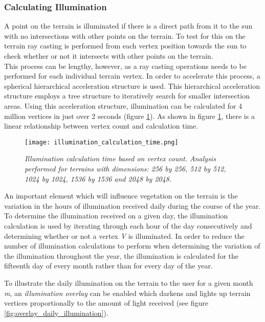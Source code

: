 \subsubsection{Calculating Illumination}

A point on the terrain is illuminated if there is a direct path from it to the sun with no intersections with other points on the terrain. To test for this on the terrain ray casting is performed from each vertex position towards the sun to check whether or not it intersects with other points on the terrain.\\
This process can be lengthy, however, as a ray casting operations needs to be performed for each individual terrain vertex. In order to accelerate this process, a spherical hierarchical acceleration structure is used. This hierarchical acceleration structure employs a tree structure to iteratively search for smaller intersection areas. Using this acceleration structure, illumination can be calculated for 4 million vertices in just over 2 seconds (figure \ref{fig:illumination_calculation_time}). As shown in figure \ref{fig:illumination_calculation_time}, there is a linear relationship between vertex count and calculation time. \\

\begin{figure}
\center
	\texttt{[image: illumination\_calculation\_time.png]}
	\caption{ \textit{Illumination calculation time based on vertex count. Analysis performed for terrains with dimensions: 256 by 256, 512 by 512, 1024 by 1024, 1536 by 1536 and 2048 by 2048.} }
	\label{fig:illumination_calculation_time}
\end{figure}

An important element which will influence vegetation on the terrain is the variation in the hours of illumination received daily during the course of the year. To determine the illumination received on a given day, the illumination calculation is used by iterating through each hour of the day consecutively and determining whether or not a vertex \textit{V} is illuminated. In order to reduce the number of illumination calculations to perform when determining the variation of the illumination throughout the year, the illumination is calculated for the fifteenth day of every month rather than for every day of the year.

To illustrate the daily illumination on the terrain to the user for a given month \textit{m}, an \textit{illumination overlay} can be enabled which darkens and lights up terrain vertices proportionally to the amount of light received (see figure \ref{fig:overlay_daily_illumination}).

